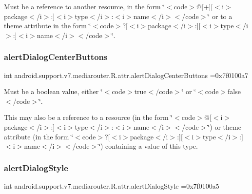 Must be a reference to another resource, in the form \char`\"{}$<$code$>$@\mbox{[}+\mbox{]}\mbox{[}$<$i$>$package$<$/i$>$\+:\mbox{]}$<$i$>$type$<$/i$>$\+:$<$i$>$name$<$/i$>$$<$/code$>$\char`\"{} or to a theme attribute in the form \char`\"{}$<$code$>$?\mbox{[}$<$i$>$package$<$/i$>$\+:\mbox{]}\mbox{[}$<$i$>$type$<$/i$>$\+:\mbox{]}$<$i$>$name$<$/i$>$$<$/code$>$\char`\"{}. \mbox{\label{classandroid_1_1support_1_1v7_1_1mediarouter_1_1R_1_1attr_a6ba9929beb9756974cd9b8c42dff7857}} 
\subsubsection{\texorpdfstring{alert\+Dialog\+Center\+Buttons}{alertDialogCenterButtons}}
{\footnotesize\ttfamily int android.\+support.\+v7.\+mediarouter.\+R.\+attr.\+alert\+Dialog\+Center\+Buttons =0x7f0100a7\hspace{0.3cm}{\ttfamily [static]}}

Must be a boolean value, either \char`\"{}$<$code$>$true$<$/code$>$\char`\"{} or \char`\"{}$<$code$>$false$<$/code$>$\char`\"{}. 

This may also be a reference to a resource (in the form \char`\"{}$<$code$>$@\mbox{[}$<$i$>$package$<$/i$>$\+:\mbox{]}$<$i$>$type$<$/i$>$\+:$<$i$>$name$<$/i$>$$<$/code$>$\char`\"{}) or theme attribute (in the form \char`\"{}$<$code$>$?\mbox{[}$<$i$>$package$<$/i$>$\+:\mbox{]}\mbox{[}$<$i$>$type$<$/i$>$\+:\mbox{]}$<$i$>$name$<$/i$>$$<$/code$>$\char`\"{}) containing a value of this type. \mbox{\label{classandroid_1_1support_1_1v7_1_1mediarouter_1_1R_1_1attr_af17b398dd801c0d70f81ba58e0201871}} 
\subsubsection{\texorpdfstring{alert\+Dialog\+Style}{alertDialogStyle}}
{\footnotesize\ttfamily int android.\+support.\+v7.\+mediarouter.\+R.\+attr.\+alert\+Dialog\+Style =0x7f0100a5\hspace{0.3cm}{\ttfamily [static]}}

